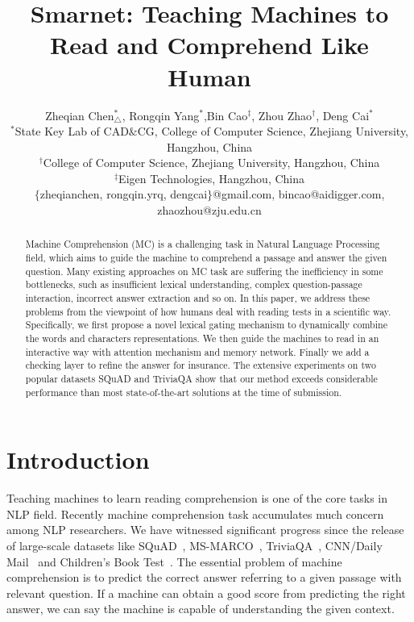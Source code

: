 \documentclass[letterpaper]{article} %
\begin{document}
%
\title{Smarnet: Teaching Machines to Read and Comprehend Like Human}
\author{
	Zheqian Chen$^*_{\bigtriangleup}$, Rongqin Yang$^*$,Bin Cao$^\ddagger$, Zhou Zhao$^\dag$,  Deng Cai$^*$\\
	$^*$State Key Lab of CAD$\&$CG, College of Computer Science, Zhejiang University, Hangzhou, China\\
	$^\dag$College of Computer Science, Zhejiang University, Hangzhou, China\\
	$^\ddagger$Eigen Technologies, Hangzhou, China\\
	$\{$zheqianchen, rongqin.yrq, dengcai$\}$@gmail.com, bincao@aidigger.com, zhaozhou@zju.edu.cn \\
}
\maketitle

\begin{abstract}
Machine Comprehension (MC) is a challenging task in Natural Language Processing field, which aims to guide the machine to comprehend a passage and answer the given question. Many existing approaches on MC task are suffering the inefficiency in some bottlenecks, such as insufficient lexical understanding, complex question-passage interaction, incorrect answer extraction and so on. In this paper, we address these problems from the viewpoint of how humans deal with reading tests in a scientific way. Specifically, we first propose a novel lexical gating mechanism to dynamically combine the words and characters representations. We then guide the machines to read in an interactive way with attention mechanism and memory network. Finally we add a checking layer to refine the answer for insurance. The extensive experiments on two popular datasets SQuAD and TriviaQA show that our method exceeds considerable performance than most state-of-the-art solutions at the time of submission. 
\end{abstract}

\section{Introduction}
Teaching machines to learn reading comprehension is one of the core tasks in NLP field. Recently machine comprehension task accumulates much concern among NLP researchers. We have witnessed significant progress since the release of large-scale datasets like SQuAD~\cite{rajpurkar2016squad}, MS-MARCO~\cite{Nguyen2016MS}, TriviaQA~\cite{Joshi2017TriviaQAAL}, CNN/Daily Mail~\cite{Hermann2015TeachingMT} and Children's Book Test~\cite{Hill2015The}. The essential problem of machine comprehension is to predict the correct answer referring to a given passage with relevant question. If a machine can obtain a good score from predicting the right answer, we can say the machine is capable of understanding the given context.
\end{document}
